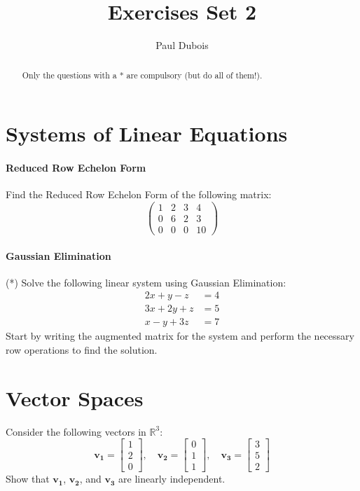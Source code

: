 \documentclass[]{article}
\title{Exercises Set 2}
\author{Paul Dubois}
\begin{document}
	
	\maketitle
	
	\begin{abstract}
		Only the questions with a * are compulsory (but do all of them!).
	\end{abstract}
	
	\section{Systems of Linear Equations}
	\paragraph{Reduced Row Echelon Form}
	Find the Reduced Row Echelon Form of the following matrix:
	$$\begin{pmatrix}
		1 & 2 & 3 & 4\\
		0 & 6 & 2 & 3\\
		0 & 0 & 0 & 10
	\end{pmatrix}$$
	
	\paragraph{Gaussian Elimination}
	(*) Solve the following linear system using Gaussian Elimination:
	\begin{align*}
		2x + y - z &= 4 \\
		3x + 2y + z &= 5 \\
		x - y + 3z &= 7
	\end{align*}
	Start by writing the augmented matrix for the system and perform the necessary row operations to find the solution.
	
	
	\section{Vector Spaces}
	Consider the following vectors in $\mathbb{R}^3$:
	$$
	\mathbf{v_1} = \begin{bmatrix}
		1 \\
		2 \\
		0
	\end{bmatrix}, \quad
	\mathbf{v_2} = \begin{bmatrix}
		0 \\
		1 \\
		1
	\end{bmatrix}, \quad
	\mathbf{v_3} = \begin{bmatrix}
		3 \\
		5 \\
		2
	\end{bmatrix}
	$$
	Show that $\mathbf{v_1}$, $\mathbf{v_2}$, and $\mathbf{v_3}$ are linearly independent.
	
\end{document}
